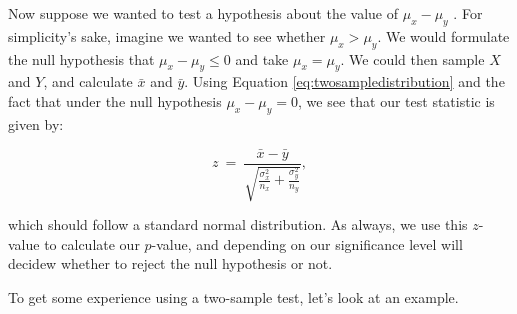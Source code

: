 Now suppose we wanted to test a hypothesis about the value of $\mu_x - \mu_y$  .  For simplicity's sake, imagine we wanted to see whether $\mu_x > \mu_y$.   We would formulate the null hypothesis that $\mu_x - \mu_y \leq 0$ and take $\mu_x = \mu_y$.  We could then sample $X$ and $Y$, and calculate $\bar{x}$ and $\bar{y}$.  Using Equation \ref{eq:twosampledistribution} and the fact that under the null hypothesis $\mu_x - \mu_y = 0$, we see that our test statistic is given by:



\begin{equation*}

z \ = \ \frac{\bar{x} - \bar{y}}{\sqrt{\frac{\sigma^2_x}{n_x} + \frac{\sigma^2_y}{n_y}}},

\end{equation*}

which should follow a standard normal distribution.  As always, we use this $z$-value to calculate our $p$-value, and depending on our significance level will decidew whether to reject the null hypothesis or not.



\begin{table}[h]

\begin{center}


\end{center}

\end{table}



To get some experience using a two-sample test, let's look at an example.



